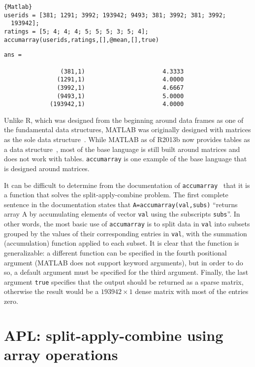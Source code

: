 \documentclass[11pt]{asaproc}
\begin{document}
\begin{lstlisting}{Matlab}
userids = [381; 1291; 3992; 193942; 9493; 381; 3992; 381; 3992;
  193942];
ratings = [5; 4; 4; 4; 5; 5; 5; 3; 5; 4];
accumarray(userids,ratings,[],@mean,[],true)
\end{lstlisting}
\begin{verbatim}
ans =

                (381,1)                      4.3333
               (1291,1)                      4.0000
               (3992,1)                      4.6667
               (9493,1)                      5.0000
             (193942,1)                      4.0000
\end{verbatim}

Unlike R, which was designed from the beginning around data frames as one of
the fundamental data structures, MATLAB was originally designed with matrices
as the sole data structure~\citep{Moler1980,Moler1982}. While MATLAB as of
R2013b now provides tables as a data structure~\citep{Shure2013}, most of the
base language is still built around matrices and does not work with tables.
\lstinline|accumarray| is one example of the base language that is designed
around matrices.

It can be difficult to determine from the documentation of
\lstinline|accumarray|~\citep{accumarray} that it is a function that solves the
split-apply-combine problem. The first complete sentence in the documentation
states that \lstinline|A=accumarray(val,subs)| ``returns array A by
accumulating elements of vector \lstinline|val| using the subscripts
\lstinline|subs|''. In other words, the most basic use of
\lstinline|accumarray| is to split data in  \lstinline|val| into subsets
grouped by the values of their corresponding entries in \lstinline|val|, with
the summation (accumulation) function applied to each subset. It is clear that
the function is generalizable: a different function can be specified in the
fourth positional argument (MATLAB does not support keyword arguments), but in
order to do so, a default argument must be specified for the third argument.
Finally, the last argument \lstinline|true| specifies that the output should be
returned as a sparse matrix, otherwise the result would be a $193942\times1$
dense matrix with most of the entries zero.



\section{APL: split-apply-combine using array operations}
\end{document}
